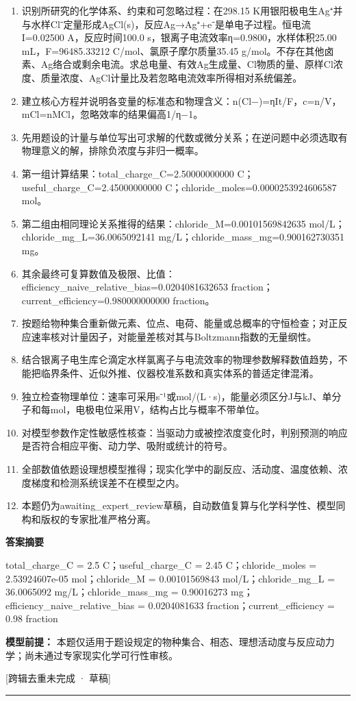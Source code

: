 \documentclass[UTF8,11pt,a4paper]{ctexart}
\begin{document}
\begin{enumerate}
\item 识别所研究的化学体系、约束和可忽略过程：在298.15 K用银阳极电生Ag⁺并与水样Cl⁻定量形成AgCl(s)，反应Ag→Ag⁺+e⁻是单电子过程。恒电流I=0.02500 A，反应时间100.0 s，银离子电流效率η=0.9800，水样体积25.00 mL，F=96485.33212 C/mol、氯原子摩尔质量35.45 g/mol。不存在其他卤素、Ag络合或剩余电流。求总电量、有效Ag生成量、Cl物质的量、原样Cl浓度、质量浓度、AgCl计量比及若忽略电流效率所得相对系统偏差。
\item 建立核心方程并说明各变量的标准态和物理含义：n(Cl−)=ηIt/F，c=n/V，mCl=nMCl，忽略效率的结果偏高1/η−1。
\item 先用题设的计量与单位写出可求解的代数或微分关系；在逆问题中必须选取有物理意义的解，排除负浓度与非归一概率。
\item 第一组计算结果：total\_charge\_C=2.50000000000 C；useful\_charge\_C=2.45000000000 C；chloride\_moles=0.0000253924606587 mol。
\item 第二组由相同理论关系推得的结果：chloride\_M=0.00101569842635 mol/L；chloride\_mg\_L=36.0065092141 mg/L；chloride\_mass\_mg=0.900162730351 mg。
\item 其余最终可复算数值及极限、比值：efficiency\_naive\_relative\_bias=0.0204081632653 fraction；current\_efficiency=0.980000000000 fraction。
\item 按题给物种集合重新做元素、位点、电荷、能量或总概率的守恒检查；对正反应速率核对计量因子，对能量差核对其与Boltzmann指数的无量纲性。
\item 结合银离子电生库仑滴定水样氯离子与电流效率的物理参数解释数值趋势，不能把临界条件、近似外推、仪器校准系数和真实体系的普适定律混淆。
\item 独立检查物理单位：速率可采用s⁻¹或mol/(L·s)，能量必须区分J与kJ、单分子和每mol，电极电位采用V，结构占比与概率不带单位。
\item 对模型参数作定性敏感性核查：当驱动力或被控浓度变化时，判别预测的响应是否符合相应平衡、动力学、吸附或统计的符号。
\item 全部数值依题设理想模型推得；现实化学中的副反应、活动度、温度依赖、浓度梯度和检测系统误差不在模型之内。
\item 本题仍为awaiting\_expert\_review草稿，自动数值复算与化学科学性、模型同构和版权的专家批准严格分离。
\end{enumerate}
\noindent\textbf{答案摘要}\par
total\_charge\_C = 2.5 C；useful\_charge\_C = 2.45 C；chloride\_moles = 2.53924607e-05 mol；chloride\_M = 0.00101569843 mol/L；chloride\_mg\_L = 36.0065092 mg/L；chloride\_mass\_mg = 0.90016273 mg；efficiency\_naive\_relative\_bias = 0.0204081633 fraction；current\_efficiency = 0.98 fraction\par
\noindent\textbf{模型前提：}
本题仅适用于题设规定的物种集合、相态、理想活动度与反应动力学；尚未通过专家现实化学可行性审核。\par
\noindent\textcolor{red!65!black}{[跨辑去重未完成 · 草稿]} \par
\medskip\hrule\medskip
{}
\end{document}
